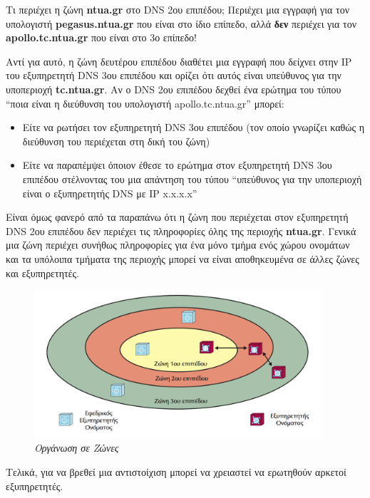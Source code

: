 \begin{inthebox}
Τι περιέχει η ζώνη \textbf{ntua.gr} στο DNS 2ου επιπέδου; Περιέχει μια εγγραφή για τον υπολογιστή \textbf{pegasus.ntua.gr} που είναι στο ίδιο επίπεδο, αλλά \textbf{δεν} περιέχει για τον \textbf{apollo.tc.ntua.gr} που είναι στο 3ο επίπεδο!

Αντί για αυτό, η ζώνη δευτέρου επιπέδου διαθέτει μια εγγραφή που δείχνει στην IP του εξυπηρετητή DNS 3ου επιπέδου και ορίζει ότι αυτός είναι υπεύθυνος για την υποπεριοχή \textbf{tc.ntua.gr}. Αν ο DNS 2ου επιπέδου δεχθεί ένα ερώτημα του τύπου ``ποια είναι η διεύθυνση του υπολογιστή apollo.tc.ntua.gr'' μπορεί:

\begin{itemize}
\item Είτε να ρωτήσει τον εξυπηρετητή DNS 3ου επιπέδου (τον οποίο γνωρίζει καθώς η διεύθυνση του περιέχεται στη δική του ζώνη)
\item Είτε να παραπέμψει όποιον έθεσε το ερώτημα στον εξυπηρετητή DNS 3ου επιπέδου στέλνοντας του μια απάντηση του τύπου ``υπεύθυνος για την υποπεριοχή είναι ο εξυπηρετητής DNS με IP x.x.x.x''
\end{itemize}

Είναι όμως φανερό από τα παραπάνω ότι η ζώνη που περιέχεται στον εξυπηρετητή DNS 2ου επιπέδου δεν περιέχει τις πληροφορίες όλης της περιοχής \textbf{ntua.gr}. Γενικά μια ζώνη περιέχει συνήθως πληροφορίες για ένα μόνο τμήμα ενός χώρου ονομάτων και τα υπόλοιπα τμήματα της περιοχής μπορεί να είναι αποθηκευμένα σε άλλες ζώνες και εξυπηρετητές.\\
\end{inthebox}

\begin{figure}[!ht]
  \centering
  \includegraphics[width=0.95\textwidth]{images/chapter6/6-4}
  \caption {\textsl{Οργάνωση σε Ζώνες}}
  \label{6-4}
\end{figure}

Τελικά, για να βρεθεί μια αντιστοίχιση μπορεί να χρειαστεί να ερωτηθούν αρκετοί εξυπηρετητές.

